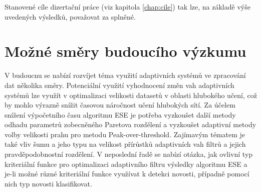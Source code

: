 \par
Stanovené cíle dizertační práce (viz kapitola \ref{chap:cile}) tak lze, na základě výše uvedených výsledků, považovat za splněné.

\section{Možné směry budoucího výzkumu}
V budoucnu se nabízí rozvíjet téma využití adaptivních systémů ve zpracování dat několika směry. Potenciální využití vyhodnocení změn vah adaptivních systémů lze využít v optimalizaci velikosti datasetů v oblasti hlubokého učení, což by mohlo výrazně snížit časovou náročnost učení hlubokých sítí. Za účelem snížení výpočetního času algoritmu ESE je potřeba vyzkoušet další metody odhadu parametrů zobecněného Paretova rozdělení a vyzkoušet adaptivní metody volby velikosti prahu pro metodu Peak-over-threshold. Zajímavým tématem je také vliv šumu a jeho typu na velikost přírůstků adaptivních vah filtrů a jejich pravděpodobnostní rozdělení. V neposlední řadě se nabízí otázka, jak ovlivní typ kriteriální funkce pro optimalizaci adaptivního filtru výsledky algoritmu ESE a je-li možné různé kriteriální funkce využívat k detekci novosti, případně pomocí nich typ novosti klasifikovat. 